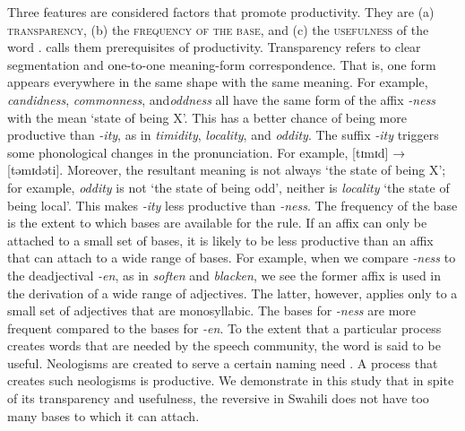 \documentclass[output=paper]{langsci/langscibook}
\begin{document}
Three features are considered factors that promote productivity. They are (a) \textsc{transparency}, (b) the \textsc{frequency of the base}, and (c) the \textsc{usefulness} of the word \citep{Bauer2001,Lieber2009}. \citet{Bauer2001} calls them prerequisites of productivity. Transparency refers to clear segmentation and one-to-one meaning-form correspondence. That is, one form appears everywhere in the same shape with the same meaning. For example, \textit{candidness}, \textit{commonness}, and\textit{oddness} all have the same form of the affix \textit{-ness} with the mean ‘state of being X’. This has a better chance of being more productive than \textit{-ity}, as in \textit{timidity}, \textit{locality}, and \textit{oddity}. The suffix \textit{-ity} triggers some phonological changes in the pronunciation. For example, [tɪmɪd] → [təmɪdəti]. Moreover, the resultant meaning is not always ‘the state of being X’; for example, \textit{oddity} is not ‘the state of being odd’, neither is \textit{locality} ‘the state of being local’. This makes \textit{-ity} less productive than \textit{-ness}. The frequency of the base is the extent to which bases are available for the rule. If an affix can only be attached to a small set of bases, it is likely to be less productive than an affix that can attach to a wide range of bases. For example, when we compare \textit{-ness} to the deadjectival \textit{-en}, as in \textit{soften} and \textit{blacken}, we see the former affix is used in the derivation of a wide range of adjectives. The latter, however, applies only to a small set of adjectives that are monosyllabic. The bases for \textit{-ness} are more frequent compared to the bases for \textit{-en}. To the extent that a particular process creates words that are needed by the speech community, the word is said to be useful. Neologisms are created to serve a certain naming need \citep{Stekauer2005}. A process that creates such neologisms is productive. We demonstrate in this study that in spite of its transparency and usefulness, the reversive in Swahili does not have too many bases to which it can attach. 
\end{document}
